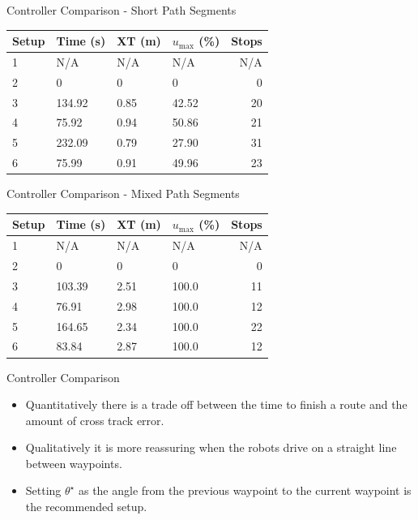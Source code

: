 \documentclass[hyperref={pdfpagelabels=false}]{beamer}
\begin{document}
\begin{frame}{Controller Comparison - Short Path Segments}
\begin{table}[ht!]
\small
\centering
\begin{tabular}{@{}llllr@{}} \toprule
Setup & Time (s) & XT (m) & $u_{\text{max}}$ (\%) & Stops \\ \midrule
1     & N/A      & N/A    & N/A                   & N/A   \\
2     & 0        & 0      & 0                     & 0     \\
3     & 134.92   & 0.85   & 42.52                 & 20    \\
4     & 75.92    & 0.94   & 50.86                 & 21    \\
5     & 232.09   & 0.79   & 27.90                 & 31    \\
6     & 75.99    & 0.91   & 49.96                 & 23    \\ \bottomrule
\end{tabular}
\end{table}
\end{frame}

\begin{frame}{Controller Comparison - Mixed Path Segments}
\begin{table}[ht!]
\small
\centering
\begin{tabular}{@{}llllr@{}} \toprule
Setup & Time (s) & XT (m) & $u_{\text{max}}$ (\%) & Stops \\ \midrule
1     & N/A      & N/A    & N/A                   & N/A   \\
2     & 0        & 0      & 0                     & 0     \\
3     & 103.39   & 2.51   & 100.0                 & 11    \\
4     & 76.91    & 2.98   & 100.0                 & 12    \\
5     & 164.65   & 2.34   & 100.0                 & 22    \\
6     & 83.84    & 2.87   & 100.0                 & 12    \\ \bottomrule
\end{tabular}
\end{table}
\end{frame}

\begin{frame}{Controller Comparison}
\begin{itemize}
\item Quantitatively there is a trade off between the time to finish a route and the amount of cross track error.
\item Qualitatively it is more reassuring when the robots drive on a straight line between waypoints.
\item Setting $\theta^\star$ as the angle from the previous waypoint to the current waypoint is the recommended setup.
\end{itemize}
\end{frame}
\end{document}
